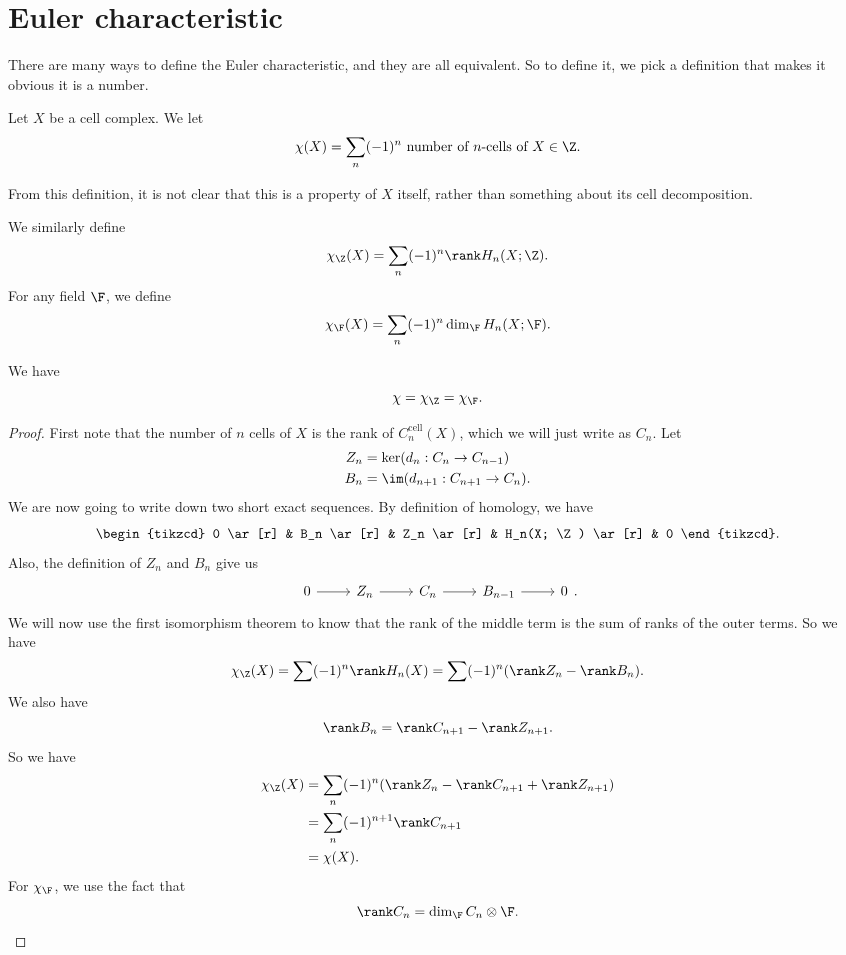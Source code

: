 \documentclass[a4paper]{article}
\theoremstyle{definition}
\begin{document}
\section{Euler characteristic}
There are many ways to define the Euler characteristic, and they are all equivalent. So to define it, we pick a definition that makes it obvious it is a number.
\begin{defi}
  Let $X$ be a cell complex. We let
  \[
    \chi(X) = \sum_n (-1)^n \text{ number of $n$-cells of $X$} \in \Z.
  \]
\end{defi}
From this definition, it is not clear that this is a property of $X$ itself, rather than something about its cell decomposition.

We similarly define
\[
  \chi_{\Z}(X) = \sum_n (-1)^n \rank H_n(X; \Z).
\]
For any field $\F$, we define
\[
  \chi_{\F}(X) = \sum_n (-1)^n \dim_\F H_n(X; \F).
\]
\begin{thm}
  We have
  \[
    \chi = \chi_\Z = \chi_\F.
  \]
\end{thm}

\begin{proof}
  First note that the number of $n$ cells of $X$ is the rank of $C_n^{\mathrm{cell}}(X)$, which we will just write as $C_n$. Let
  \begin{align*}
    Z_n &= \ker (d_n: C_n \to C_{n - 1})\\
    B_n &= \im (d_{n + 1}: C_{n + 1} \to C_n).
  \end{align*}
  We are now going to write down two short exact sequences. By definition of homology, we have
  \[
    \begin{tikzcd}
      0 \ar[r] & B_n \ar[r] & Z_n \ar[r] & H_n(X; \Z) \ar[r] & 0
    \end{tikzcd}.
  \]
  Also, the definition of $Z_n$ and $B_n$ give us
  \[
    \begin{tikzcd}
      0 \ar[r] & Z_n \ar[r] & C_n \ar[r] & B_{n - 1} \ar[r] & 0
    \end{tikzcd}.
  \]
  We will now use the first isomorphism theorem to know that the rank of the middle term is the sum of ranks of the outer terms. So we have
  \[
    \chi_\Z(X) = \sum (-1)^n \rank H_n(X) = \sum(-1)^n (\rank Z_n - \rank B_n).
  \]
  We also have
  \[
    \rank B_n = \rank C_{n + 1} - \rank Z_{n + 1}.
  \]
  So we have
  \begin{align*}
    \chi_\Z(X) &= \sum_n (-1)^n (\rank Z_n - \rank C_{n + 1} + \rank Z_{n + 1}) \\
    &= \sum_n (-1)^{n + 1} \rank C_{n + 1}\\
    &= \chi(X).
  \end{align*}
  For $\chi_\F$, we use the fact that
  \[
    \rank C_n = \dim_{\F} C_n \otimes \F.\qedhere
  \]
\end{proof}
\end{document}
